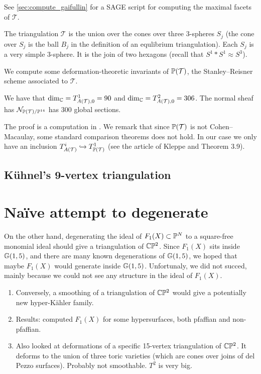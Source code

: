 See \cref{sec:compute_gaifullin} for a SAGE \cite{sagemath} script for computing the maximal facets of $\mathcal T$.

The triangulation $\mathcal T$ is the union over the cones over three $3$-spheres $S_j$ (the cone over $S_j$ is the ball $B_j$ in the definition of an equlibrium triangulation). Each $S_j$ is a very simple $3$-sphere. It is the join of two hexagons (recall that $S^1 \ast S^1 \approx S^3$).

We compute some deformation-theoretic invariants of $\P(\mathcal T)$, the Stanley--Reisner scheme associated to $\mathcal T$.

\begin{lemma}
We have that $\dim_\C = T^1_{A(\mathcal T),0}=90$ and $\dim_\C = T^2_{A(\mathcal T),0}=306$. The normal sheaf has $\mathcal N_{\P(\mathcal T)/\P^{14}}$ has $300$ global sections.
\end{lemma}
The proof is a computation in \MM. We remark that since $\P(\mathcal T)$ is not Cohen--Macaulay, some standard comparison theorems does not hold. In our case we only have an inclusion $T^i_{A(\mathcal T)} \hookrightarrow T^1_{\P(\mathcal T)}$ (see the article of Kleppe \cite{kleppe_deformations} and Theorem 3.9).

\subsection{Kühnel's 9-vertex triangulation}



\section{Naïve attempt to degenerate}

On the other hand, degenerating the ideal of $F_1(X) \subset \P^N$ to a square-free monomial ideal should give a triangulation of $\C \P^2$. Since $F_1(X)$ sits inside $\Gr(1,5)$, and there are many known degenerations of $\Gr(1,5)$, we hoped that maybe $F_1(X)$ would generate inside $\Gr(1,5)$. Unfortunaly, we did not succed, mainly because we could not see any structure in the ideal of $F_1(X)$.

\begin{enumerate}
	\item Conversely, a smoothing of a triangulation of $\C \P^2$ would give a potentially new hyper-Kähler family.
	\item Results: computed $F_1(X)$ for some hypersurfaces, both pfaffian and non-pfaffian.
	\item Also looked at deformations of a specific 15-vertex triangulation of $\C \P^2$. It deforms to the union of three toric varieties (which are cones over joins of del Pezzo surfaces). Probably not smoothable. $T^2$ is very big.
\end{enumerate}